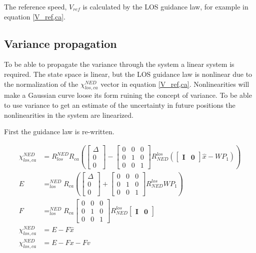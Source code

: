 The reference speed, $V_{ref}$ is calculated by the LOS guidance law, for example in equation \ref{V_ref,ca}.

\subsection{Variance propagation}

To be able to propagate the variance through the system a linear system is required. The state space is linear, but the LOS guidance law is nonlinear due to the normalization of the $\chi^{NED}_{los,ca}$ vector in equation \ref{V_ref,ca}. Nonlinearities will make a Gaussian curve loose its form ruining the concept of variance. To be able to use variance to get an estimate of the uncertainty in future positions the nonlinearities in the system are linearized.

First the guidance law is re-written.

\begin{align}
    \chi^{NED}_{los,ca} & = R^{NED}_{los}  R_{ca} \left(  \begin{bmatrix}\Delta \\ 0 \\ 0\end{bmatrix} - \begin{bmatrix} 0 & 0 & 0 \\ 0 & 1 & 0 \\ 0 & 0 & 1 \end{bmatrix} R^{los}_{NED} (\begin{bmatrix} \mathbf{I} & \mathbf{0} \end{bmatrix} \hat{x} - WP_1) \right) \\
    E & = ^{NED}_{los}  R_{ca} \left(  \begin{bmatrix}\Delta \\ 0 \\ 0\end{bmatrix} + \begin{bmatrix} 0 & 0 & 0 \\ 0 & 1 & 0 \\ 0 & 0 & 1 \end{bmatrix} R^{los}_{NED} WP_1 \right) \\
    F & = ^{NED}_{los}  R_{ca}  \begin{bmatrix} 0 & 0 & 0 \\ 0 & 1 & 0 \\ 0 & 0 & 1 \end{bmatrix} R^{los}_{NED}  \begin{bmatrix} \mathbf{I} & \mathbf{0} \end{bmatrix} \\
    \chi^{NED}_{los,ca} & = E - F \hat{x} \\
    \chi^{NED}_{los,ca} & = E - F x - F v 
\end{align}

